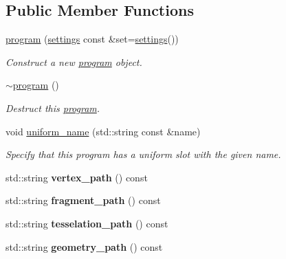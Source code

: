\subsection*{Public Member Functions}
\begin{DoxyCompactItemize}
\item 
\hyperlink{classgfx_1_1program_a5f3c772a1cfeedfbf605f07a6c5c2ced}{program} (\hyperlink{classgfx_1_1program_1_1settings}{settings} const \&set=\hyperlink{classgfx_1_1program_1_1settings}{settings}())
\begin{DoxyCompactList}\small\item\em Construct a new \hyperlink{classgfx_1_1program}{program} object. \end{DoxyCompactList}\item 
\hypertarget{classgfx_1_1program_a4a13d9cc7adce2250ce24332e68481f3}{\hyperlink{classgfx_1_1program_a4a13d9cc7adce2250ce24332e68481f3}{$\sim$program} ()}\label{classgfx_1_1program_a4a13d9cc7adce2250ce24332e68481f3}

\begin{DoxyCompactList}\small\item\em Destruct this \hyperlink{classgfx_1_1program}{program}. \end{DoxyCompactList}\item 
void \hyperlink{classgfx_1_1program_af26c121d657805935a542e3eb1320389}{uniform\-\_\-name} (std\-::string const \&name)
\begin{DoxyCompactList}\small\item\em Specify that this program has a uniform slot with the given name. \end{DoxyCompactList}\item 
\hypertarget{classgfx_1_1program_a30bd1c354331da8a752b37aceba11292}{std\-::string {\bfseries vertex\-\_\-path} () const }\label{classgfx_1_1program_a30bd1c354331da8a752b37aceba11292}

\item 
\hypertarget{classgfx_1_1program_ae81ef9ea75db894d3a0ad58b34229000}{std\-::string {\bfseries fragment\-\_\-path} () const }\label{classgfx_1_1program_ae81ef9ea75db894d3a0ad58b34229000}

\item 
\hypertarget{classgfx_1_1program_aeecb4ba118bae38aa087a1115ff01724}{std\-::string {\bfseries tesselation\-\_\-path} () const }\label{classgfx_1_1program_aeecb4ba118bae38aa087a1115ff01724}

\item 
\hypertarget{classgfx_1_1program_aa80f6f1a9f581f30c96fe2cc4c589cac}{std\-::string {\bfseries geometry\-\_\-path} () const }\label{classgfx_1_1program_aa80f6f1a9f581f30c96fe2cc4c589cac}


\end{DoxyCompactItemize}
